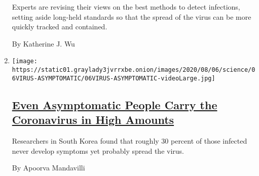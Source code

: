 \begin{enumerate}
  Experts are revising their views on the best methods to detect
  infections, setting aside long-held standards so that the spread of
  the virus can be more quickly tracked and contained.

  By Katherine J. Wu
\item
  \texttt{[image: https://static01.graylady3jvrrxbe.onion/images/2020/08/06/science/06VIRUS-ASYMPTOMATIC/06VIRUS-ASYMPTOMATIC-videoLarge.jpg]}

  \hypertarget{even-asymptomatic-people-carry-the-coronavirus-in-high-amounts}{%
  \subsection{\texorpdfstring{\href{/2020/08/06/health/coronavirus-asymptomatic-transmission.html}{Even
  Asymptomatic People Carry the Coronavirus in High
  Amounts}}{Even Asymptomatic People Carry the Coronavirus in High Amounts}}\label{even-asymptomatic-people-carry-the-coronavirus-in-high-amounts}}

  Researchers in South Korea found that roughly 30 percent of those
  infected never develop symptoms yet probably spread the virus.

  By Apoorva Mandavilli
\end{enumerate}

